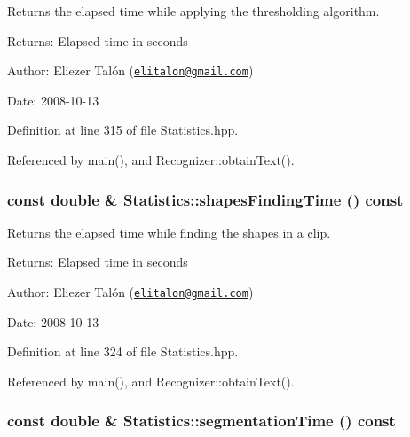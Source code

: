Returns the elapsed time while applying the thresholding algorithm. 

\begin{Desc}
\item[Returns:]Elapsed time in seconds\end{Desc}
\begin{Desc}
\item[Author:]Eliezer Talón (\href{mailto:elitalon@gmail.com}{\tt elitalon@gmail.com}) \end{Desc}
\begin{Desc}
\item[Date:]2008-10-13 \end{Desc}


Definition at line 315 of file Statistics.hpp.

Referenced by main(), and Recognizer::obtainText().\hypertarget{class_statistics_9437fbc6726c6179b3ee4c130520e642}{
\subsubsection[shapesFindingTime]{\setlength{\rightskip}{0pt plus 5cm}const double \& Statistics::shapesFindingTime () const}}
\label{class_statistics_9437fbc6726c6179b3ee4c130520e642}


Returns the elapsed time while finding the shapes in a clip. 

\begin{Desc}
\item[Returns:]Elapsed time in seconds\end{Desc}
\begin{Desc}
\item[Author:]Eliezer Talón (\href{mailto:elitalon@gmail.com}{\tt elitalon@gmail.com}) \end{Desc}
\begin{Desc}
\item[Date:]2008-10-13 \end{Desc}


Definition at line 324 of file Statistics.hpp.

Referenced by main(), and Recognizer::obtainText().\hypertarget{class_statistics_f4c992e9970bce97b9a33100db689739}{
\subsubsection[segmentationTime]{\setlength{\rightskip}{0pt plus 5cm}const double \& Statistics::segmentationTime () const}}
\label{class_statistics_f4c992e9970bce97b9a33100db689739}


